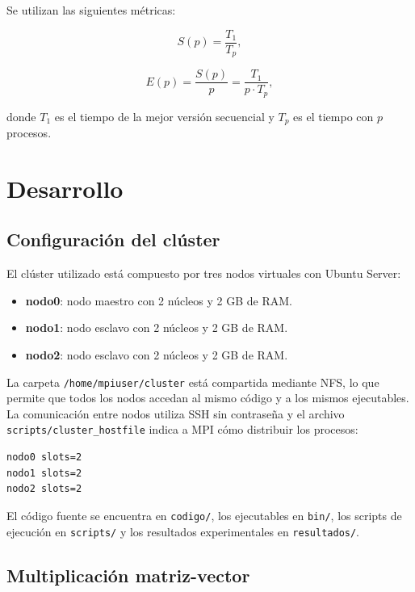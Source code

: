 \documentclass[12pt,a4paper]{article}
\begin{document}
Se utilizan las siguientes métricas:

\begin{equation}
    S(p) = \frac{T_1}{T_p},
\end{equation}

\begin{equation}
    E(p) = \frac{S(p)}{p} = \frac{T_1}{p \cdot T_p},
\end{equation}

donde $T_1$ es el tiempo de la mejor versión secuencial y $T_p$ es el tiempo con $p$ procesos.

\section{Desarrollo}
\label{sec:desarrollo}

\subsection{Configuración del clúster}

El clúster utilizado está compuesto por tres nodos virtuales con Ubuntu Server:

\begin{itemize}
    \item \textbf{nodo0}: nodo maestro con 2 núcleos y 2 GB de RAM.
    \item \textbf{nodo1}: nodo esclavo con 2 núcleos y 2 GB de RAM.
    \item \textbf{nodo2}: nodo esclavo con 2 núcleos y 2 GB de RAM.
\end{itemize}

La carpeta \texttt{/home/mpiuser/cluster} está compartida mediante NFS, lo que permite que todos los nodos accedan al mismo código y a los mismos ejecutables. La comunicación entre nodos utiliza SSH sin contraseña y el archivo \texttt{scripts/cluster\_hostfile} indica a MPI cómo distribuir los procesos:

\begin{lstlisting}[language=bash,caption=Archivo de hosts del clúster]
nodo0 slots=2
nodo1 slots=2
nodo2 slots=2
\end{lstlisting}

El código fuente se encuentra en \texttt{codigo/}, los ejecutables en \texttt{bin/}, los scripts de ejecución en \texttt{scripts/} y los resultados experimentales en \texttt{resultados/}.

\subsection{Multiplicación matriz-vector}
\end{document}
